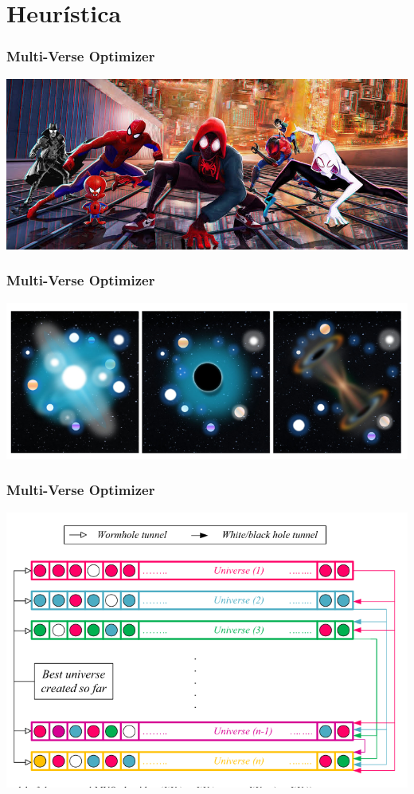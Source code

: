 \documentclass{beamer}
\begin{document}
\section{Heurística}
\begin{frame}
  \frametitle{Multi-Verse Optimizer}
  \begin{center}
    \includegraphics[scale=0.3]{spider-verse.jpg}
  \end{center}
\end{frame}

\begin{frame}
  \frametitle{Multi-Verse Optimizer}
  \begin{center}
    \includegraphics[scale=0.3]{holes.png}
  \end{center}
\end{frame}

\begin{frame}
  \frametitle{Multi-Verse Optimizer}
  \begin{center}
    \includegraphics[scale=0.27]{representation.png}
  \end{center}
\end{frame}
\end{document}

